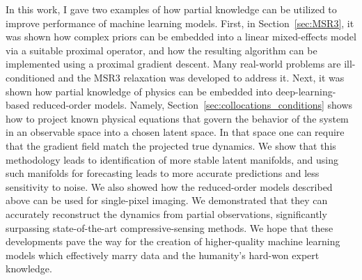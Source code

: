 In this work, I gave two examples of how partial knowledge can be utilized to improve performance of machine learning models. First, in Section~\ref{sec:MSR3}, it was shown how complex priors can be embedded into a linear mixed-effects model via a suitable proximal operator, and how the resulting algorithm can be implemented using a proximal gradient descent. Many real-world problems are ill-conditioned and the MSR3 relaxation was developed to address it. Next, it was shown how partial knowledge of physics can be embedded into deep-learning-based reduced-order models. Namely, Section~\ref{sec:collocations_conditions} shows how to project known physical equations that govern the behavior of the system in an observable space into a chosen latent space. In that space one can require that the gradient field match the projected true dynamics. We show that this methodology leads to identification of more stable latent manifolds, and using such manifolds for forecasting leads to more accurate predictions and less sensitivity to noise. We also showed how the reduced-order models described above can be used for single-pixel imaging. We demonstrated that they can accurately reconstruct the dynamics from partial observations, significantly surpassing state-of-the-art compressive-sensing methods. We hope that these developments pave the way for the creation of higher-quality machine learning models which effectively marry data and the humanity's hard-won expert knowledge. 

